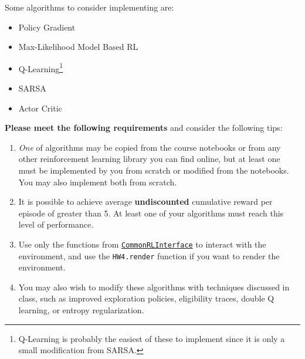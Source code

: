 \documentclass{article}
\theoremstyle{definition}
\begin{document}
Some algorithms to consider implementing are:
    \begin{itemize}[noitemsep]
        \item Policy Gradient
        \item Max-Likelihood Model Based RL
        \item Q-Learning\footnote{Q-Learning is probably the easiest of these to implement since it is only a small modification from SARSA.}
        \item SARSA
        \item Actor Critic
    \end{itemize}
    \textbf{Please meet the following requirements} and consider the following tips:
    \begin{enumerate}
        \item \emph{One} of algorithms may be copied from the course notebooks or from any other reinforcement learning library you can find online, but at least one must be implemented by you from scratch or modified from the notebooks. You may also implement both from scratch.
        \item It is possible to achieve average \textbf{undiscounted} cumulative reward per episode of greater than 5. At least one of your algorithms must reach this level of performance.
        \item Use only the functions from \href{https://github.com/JuliaReinforcementLearning/CommonRLInterface.jl}{\texttt{CommonRLInterface}} to interact with the environment, and use the \texttt{HW4.render} function if you want to render the environment.
        \item You may also wish to modify these algorithms with techniques discussed in class, such as improved exploration policies, eligibility traces, double Q learning, or entropy regularization.
    \end{enumerate}
\end{document}
